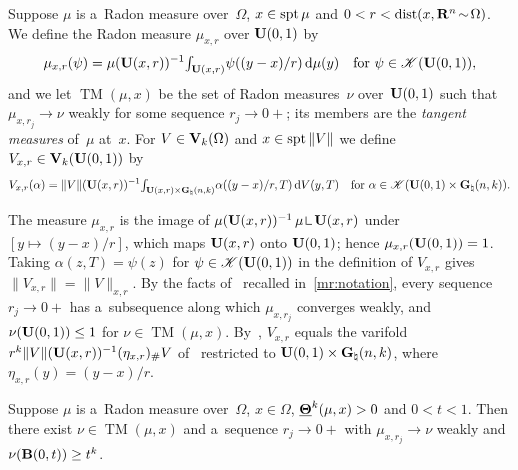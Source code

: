 \documentclass[a4paper,twoside,leqno]{article}
\newcommand{\Gk}{\pgrass{\adim}{\vdim}}        %
\DeclareMathOperator{\TM}{TM}                   %
\begin{document}
\begin{definition}
    \label{def:tangent}
    Suppose $\mu$ is a~Radon measure over~$\Omega$, $x \in \operatorname{spt} \mu$ and $0 < r <
    \operatorname{dist}(x,\mathbf{R}^{n} \!\sim\! \Omega)$. We define the Radon measure $\mu_{x,r}$ over
    $\mathbf{U}(0,1)$ by
    \begin{displaymath}
        \mu_{x,r}(\psi) = \mu(\mathbf{U}(x,r))^{-1} {\textstyle\int_{\mathbf{U}(x,r)}^{}} \psi((y-x)/r) \,\mathrm{d} \mu(y)
        \quad \text{for $\psi \in \mathscr{K}(\mathbf{U}(0,1))$},
    \end{displaymath}
    and we let $\TM(\mu,x)$ be the set of Radon measures~$\nu$ over~$\mathbf{U}(0,1)$ such that
    $\mu_{x,r_j} \to \nu$ weakly for some sequence $r_j \to 0+$; its members are the
    \emph{tangent measures} of~$\mu$ at~$x$. For $V \in \mathbf{V}_{k}(\Omega)$ and $x \in \operatorname{spt}
    \|V\|$ we define $V_{x,r} \in \mathbf{V}_{k}(\mathbf{U}(0,1))$ by
    \begin{displaymath}
        V_{x,r}(\alpha) = \|V\|(\oball{x}{r})^{-1} \textint{\oball{x}{r} \times \Gk}{}
        \alpha((y-x)/r,T) \ud V(y,T) \quad \text{for $\alpha \in \ccspace{\oball{0}{1} \times
        \Gk}$}.
    \end{displaymath}
\end{definition}

\begin{remark}
    \label{rem:tangent}
    The measure $\mu_{x,r}$ is the image of $\mu(\oball{x}{r})^{-1} \, \mu \restrict \oball{x}{r}$
    under $[ y \mapsto (y-x)/r ]$, which maps $\mathbf{U}(x,r)$ onto $\mathbf{U}(0,1)$; hence
    $\mu_{x,r}(\mathbf{U}(0,1)) = 1$. Taking $\alpha(z,T) = \psi(z)$ for $\psi \in
    \mathscr{K}(\mathbf{U}(0,1))$ in the definition of $V_{x,r}$ gives $\|V_{x,r}\| = \|V\|_{x,r}$. By the facts
    of~\cite[2.6(2)]{Allard1972} recalled in~\ref{mr:notation}, every sequence $r_j \to 0+$ has
    a~subsequence along which $\mu_{x,r_j}$ converges weakly, and $\nu(\mathbf{U}(0,1)) \le 1$ for
    $\nu \in \TM(\mu,x)$. By~\cite[3.2(1), (2)]{Allard1972}, $V_{x,r}$ equals the varifold
    $r^{k} \|V\|(\mathbf{U}(x,r))^{-1} (\eta_{x,r})_\# V$ of~\cite[p.~1129]{DePhilippis2018} restricted to
    $\oball{0}{1} \times \Gk$, where $\eta_{x,r}(y) = (y - x)/r$.
\end{remark}

\begin{lemma}
    \label{ddg:2.1}
    Suppose $\mu$ is a~Radon measure over~$\Omega$, $x \in \Omega$, $\boldsymbol{\underline{\Theta}}^{k}(\mu,x)
    > 0$ and $0 < t < 1$. Then there exist $\nu \in \TM(\mu,x)$ and a~sequence $r_j \to 0+$
    with $\mu_{x,r_j} \to \nu$ weakly and $\nu(\mathbf{B}(0,t)) \ge t^{k}$.
\end{lemma}
\end{document}
